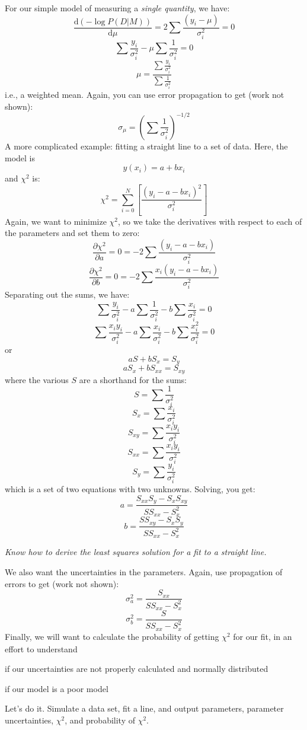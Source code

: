 \documentclass[12pt]{article}
\begin{document}
For our simple model of measuring a \emph{single quantity}, we have:
$$ \frac{\mathrm{d}(-\log P(D|M))}{\mathrm{d}\mu} =
2\sum\frac{(y_{i}-\mu)}{\sigma_i^2} = 0 $$
$$ \sum\frac{y_i}{\sigma_i^2} - \mu\sum\frac{1}{\sigma_i^2} = 0 $$
$$ \mu = \frac{\sum\frac{y_i}{\sigma_i^2}}{\sum\frac{1}{\sigma_i^2}}$$
i.e., a weighted mean. Again, you can use error
propagation to get (work not shown):
$$ \sigma_{\mu} = \left(\sum\frac{1}{\sigma_i^2}\right)^{-1/2}  $$
A more complicated example: fitting a straight line to a set of data.
Here, the model is
$$ y(x_i) = a + bx_i $$
and $\chi^2$ is:
$$ \chi^2 = \sum_{i=0}^{N}\left[\frac{(y_i-a-bx_i)^2}{\sigma_i^2}\right]  $$
Again, we want to minimize $\chi^2$, so we take the derivatives with respect
to each of the parameters and set them to zero:
$$ \frac{\partial\chi^2}{\partial{a}} = 0 = -2\sum\frac{(y_i-a-bx_i)}{\sigma_i^2} $$
$$ \frac{\partial\chi^2}{\partial{b}} = 0 = -2\sum\frac{x_i(y_i-a-bx_i)}{\sigma_i^2} $$
Separating out the sums, we have:
$$ \sum\frac{y_i}{\sigma_i^2} -
a\sum\frac{1}{\sigma_i^2} -
b\sum\frac{x_i}{\sigma_i^2} = 0 $$
$$ \sum\frac{x_iy_i}{\sigma_i^2} -
a\sum\frac{x_i}{\sigma_i^2} -
b\sum\frac{x_i^2}{\sigma_i^2} = 0 $$
or
$$ aS + bS_{x} = S_{y} $$
$$ aS_{x} + bS_{xx} = S_{xy} $$
where the various $S$ are a shorthand for the sums:
$$ S = \sum\frac{1}{\sigma_i^2}  $$
$$ S_{x} = \sum\frac{x_i}{\sigma_i^2}  $$
$$ S_{xy} = \sum\frac{x_iy_i}{\sigma_i^2}  $$
$$ S_{xx} = \sum\frac{x_iy_i}{\sigma_i^2}  $$
$$ S_{y} = \sum\frac{y_i}{\sigma_i^2}  $$
which is a set of two equations with two unknowns. Solving, you get:
$$ a = \frac{S_{xx}S_{y} - S_{x}S_{xy}}{SS_{xx} - S_{x}^{2}}  $$
$$ b = \frac{SS_{xy} - S_{x}S_{y}}{SS_{xx} - S_{x}^{2}}  $$

\colorbox{hl}{\parbox{0.9\textwidth}
{\emph{Know how to derive the least squares solution for a fit to a straight line.}}}

We also want the uncertainties in the parameters.
Again, use propagation of errors to get (work not shown):
$$ \sigma_a^2 = \frac{S_{xx}}{SS_{xx}-S_x^2}   $$
$$ \sigma_b^2 = \frac{S}{SS_{xx}-S_x^2}   $$
Finally, we will want to calculate the probability of getting
$ \chi^{2}_{}$ for our fit,
in an effort to understand
\begin{enumerate*}
    \item if our uncertainties are not properly calculated and normally distributed
    \item if our model is a poor model
\end{enumerate*}

Let's do it. Simulate a data set, fit a line, and output parameters, parameter
uncertainties, $\chi^2$, and probability of $\chi^2$.
\end{document}
